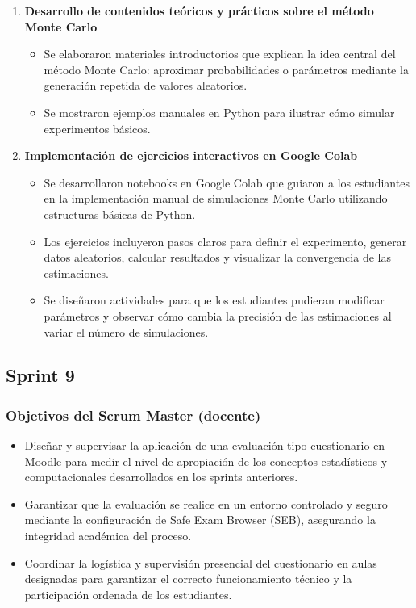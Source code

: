 \documentclass[letter,oneside,12pt,spanish]{report}
\begin{document}
\begin{enumerate}
	\item \textbf{Desarrollo de contenidos teóricos y prácticos sobre el método Monte Carlo}  
	\begin{itemize}
		\item Se elaboraron materiales introductorios que explican la idea central del método Monte Carlo: aproximar probabilidades o parámetros mediante la generación repetida de valores aleatorios.
		\item Se mostraron ejemplos manuales en Python para ilustrar cómo simular experimentos básicos.
	\end{itemize}
	
	\item \textbf{Implementación de ejercicios interactivos en Google Colab}  
	\begin{itemize}
		\item Se desarrollaron notebooks en Google Colab que guiaron a los estudiantes en la implementación manual de simulaciones Monte Carlo utilizando estructuras básicas de Python.
		\item Los ejercicios incluyeron pasos claros para definir el experimento, generar datos aleatorios, calcular resultados y visualizar la convergencia de las estimaciones.
		\item Se diseñaron actividades para que los estudiantes pudieran modificar parámetros y observar cómo cambia la precisión de las estimaciones al variar el número de simulaciones.
	\end{itemize}
\end{enumerate}

\subsection{Sprint 9}

\subsubsection*{Objetivos del Scrum Master (docente)}
\begin{itemize}
	\item Diseñar y supervisar la aplicación de una evaluación tipo cuestionario en Moodle para medir el nivel de apropiación de los conceptos estadísticos y computacionales desarrollados en los sprints anteriores.
	\item Garantizar que la evaluación se realice en un entorno controlado y seguro mediante la configuración de Safe Exam Browser (SEB), asegurando la integridad académica del proceso.
	\item Coordinar la logística y supervisión presencial del cuestionario en aulas designadas para garantizar el correcto funcionamiento técnico y la participación ordenada de los estudiantes.
\end{itemize}
\end{document}
